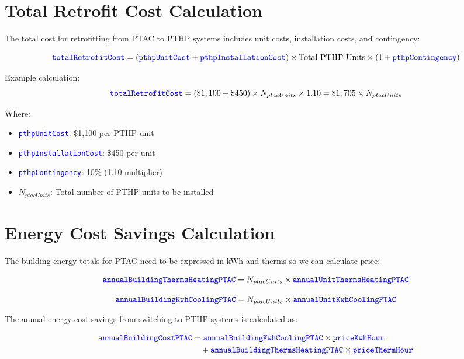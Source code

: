 \documentclass{article}
\newcommand{\code}[1]{\textcolor{blue}{\texttt{#1}}}
\begin{document}
\section{Total Retrofit Cost Calculation}

The total cost for retrofitting from PTAC to PTHP systems includes unit costs, installation costs, and contingency:

\begin{equation}
\code{totalRetrofitCost} = (\code{pthpUnitCost} + \code{pthpInstallationCost}) \times \text{Total PTHP Units} \times (1 + \code{pthpContingency})
\end{equation}

Example calculation:
\begin{equation}
\code{totalRetrofitCost} = (\$1,100 + \$450) \times N_{ptacUnits} \times 1.10 = \$1,705 \times N_{ptacUnits}
\end{equation}

Where:
\begin{itemize}
    \item \code{pthpUnitCost}: \$1,100 per PTHP unit
    \item \code{pthpInstallationCost}: \$450 per unit
    \item \code{pthpContingency}: 10\% (1.10 multiplier)
    \item $N_{ptacUnits}$: Total number of PTHP units to be installed
\end{itemize}

\section{Energy Cost Savings Calculation}

The building energy totals for PTAC need to be expressed in kWh and therms so we can calculate price:

\begin{equation}
\code{annualBuildingThermsHeatingPTAC} = N_{ptacUnits} \times \code{annualUnitThermsHeatingPTAC}
\end{equation}

\begin{equation}
\code{annualBuildingKwhCoolingPTAC} = N_{ptacUnits} \times \code{annualUnitKwhCoolingPTAC}
\end{equation}

The annual energy cost savings from switching to PTHP systems is calculated as:

\begin{align}
\code{annualBuildingCostPTAC} &= \code{annualBuildingKwhCoolingPTAC} \times \code{priceKwhHour} \nonumber \\
&\quad + \code{annualBuildingThermsHeatingPTAC} \times \code{priceThermHour}
\end{align}
\end{document}
